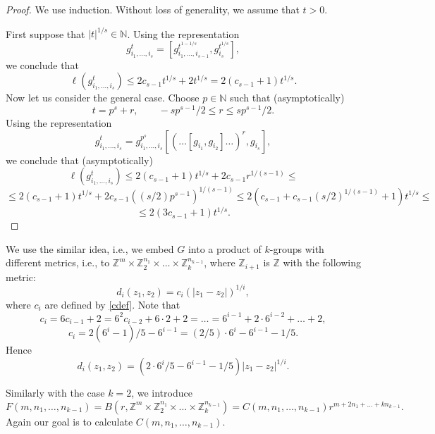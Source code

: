 \documentclass[11pt]{article}
\theoremstyle{Mystyle}
\begin{document}
\begin{proof}
We use induction. Without loss of generality, we assume that $t>0$.

First suppose that $|t|^{1/s}\in\mathbb{N}$.
Using the representation 
$$g_{i_1,\ldots, i_{s}}^{t} = [g_{i_{1},\ldots, i_{s-1}}^{t^{1 - 1/s}}, g_{i_s}^{t^{1/s}}],$$ 
we conclude that
$$\ell(g_{i_1,\ldots, i_{s}}^{t})\leq 2c_{s-1}t^{1/s} + 2t^{1/s} = 2(c_{s-1} + 1)t^{1/s}.$$
Now let us consider the general case.
Choose $p\in\mathbb{N}$ such that (asymptotically)
$$t = p^{s} + r,\qquad -sp^{s-1}/2\leq r\leq sp^{s-1}/2.$$
Using the representation 
$$g_{i_1,\ldots, i_{s}}^{t} = g_{i_1,\ldots,i_s}^{p^s}[(\ldots[g_{i_1},g_{i_2}]\ldots)^{r}, g_{i_s}],$$
we conclude that (asymptotically)
$$\ell(g_{i_1,\ldots, i_{s}}^{t})\leq 2(c_{s-1} + 1)t^{1/s} + 2c_{s-1}r^{1/(s-1)}\leq$$ 
$$\leq 2(c_{s-1} + 1)t^{1/s} + 2c_{s-1}((s/2) p^{s-1})^{1/(s-1)}\leq 2(c_{s-1} + c_{s-1}(s/2)^{1/(s-1)} + 1)t^{1/s}\leq$$
$$\leq 2(3c_{s-1} + 1)t^{1/s}.$$

\end{proof}

We use the similar idea, i.e., we embed $G$ into a product of $k$-groups with different metrics, i.e., to $\mathbb{Z}^m\times\mathbb{Z}_{2}^{n_1}\times\ldots\times\mathbb{Z}_{k}^{n_{k-1}}$, where $\mathbb{Z}_{i+1}$ is $\mathbb{Z}$ with the following metric:
\begin{equation}
\label{zdef}
d_{i}(z_1,z_2) = c_i(|z_1 - z_2|)^{1/i},
\end{equation}
where $c_{i}$ are defined by \eqref{cdef}.
Note that
$$c_{i} = 6c_{i-1} + 2 = 6^2c_{i-2} + 6\cdot 2 + 2 = \ldots = 6^{i-1} + 2\cdot 6^{i-2} + \ldots  + 2,$$
\begin{equation}
\label{cdefalt}
c_{i} = 2(6^{i} - 1)/5 - 6^{i-1} = (2/5)\cdot 6^{i} - 6^{i-1} - 1/5.
\end{equation}
Hence
$$d_{i}(z_1,z_2)=(2\cdot 6^i/5 - 6^{i-1} - 1/5)|z_1 - z_2|^{1/i}.$$

Similarly with the case $k=2$, we introduce 
$$F(m,n_1,\ldots,n_{k-1}) = B(r, \mathbb{Z}^m\times\mathbb{Z}_{2}^{n_1}\times\ldots\times\mathbb{Z}_{k}^{n_{k-1}}) =  C(m,n_1,\ldots,n_{k-1}) r^{m+2n_1+\ldots+k n_{k-1}}.$$
Again our goal is to calculate $C(m,n_1,\ldots,n_{k-1})$. 
\end{document}
